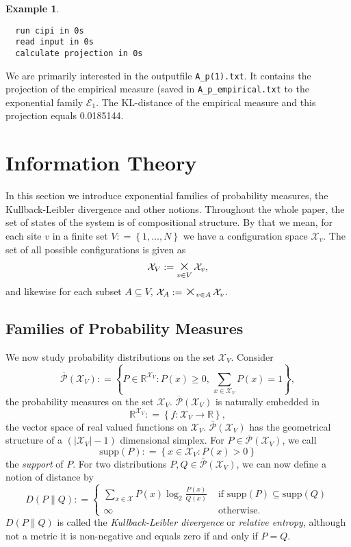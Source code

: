 \documentclass[12pt]{amsart}
\newcommand{\set}[1]{\left\lbrace #1 \right\rbrace} %
\newcommand{\defas}{\mathrel{\mathop{:}}=}   %
\renewcommand{\subset}{\subseteq}  %
\DeclareMathOperator*{\bigtimes}{\textnormal{\Large $\times$}} %
\theoremstyle{plain}%
\theoremstyle{definition}
\newtheorem{exmp}[thm]{Example}
\theoremstyle{remark}
\begin{document}
\begin{exmp}
\begin{verbatim}
  run cipi in 0s
  read input in 0s
  calculate projection in 0s
  \end{verbatim} We are
  primarily interested in the outputfile \texttt{A\_p(1).txt}. It contains the
  projection of the empirical measure (saved in \texttt{A\_p\_empirical.txt} to
  the exponential family $\mathcal{E}_1$. The KL-distance of the empirical
  measure and this projection equals 0.0185144.

\end{exmp}

\section{Information Theory}
\label{sec:theory}
In this section we introduce exponential families of probability
measures, the Kullback-Leibler divergence and other notions.
Throughout the whole paper, the set of states of the system is of compositional
structure. By that we mean, for each site $v$ in a finite set $V \defas
\set{1,\ldots, N}$ we have a configuration space $\mathcal{X}_v$. The set of all
possible configurations is given as 
\begin{equation*}
\mathcal{X}_V \defas \bigtimes_{v\in V}\mathcal{X}_v,
\end{equation*}and likewise for each subset $A\subset V$, $\mathcal{X}_A \defas
\bigtimes_{v\in A}\mathcal{X}_v$.

\subsection{Families of Probability Measures} 
We now study probability distributions on the set
$\mathcal{X}_V$. Consider 
\[
\overline{\mathcal{P}}(\mathcal{X}_V)
\defas \set{P \in \mathbb{R}^{\mathcal{X}_V} : P(x) \geq 0,\,
  \sum_{x\in\mathcal{X}_V} P(x) = 1},
\]  
the probability measures on
the set $\mathcal{X}_V$.
$\overline{\mathcal{P}}(\mathcal{X}_V)$ is naturally embedded in
\[
\mathbb{R}^{\mathcal{X}_V} \defas \set{f : \mathcal{X}_V \to \mathbb{R}},
\] the vector space of real valued functions on $\mathcal{X}_V$.
$\overline{\mathcal{P}}(\mathcal{X}_V)$ has the geometrical structure of a
$(|\mathcal{X}_V| -1)$ dimensional simplex. For $P\in
\overline{\mathcal{P}}(\mathcal{X}_V)$, we call \[ \mbox{supp}(P) \defas
\set{x \in \mathcal{X}_V : P(x) > 0} \] the \emph{support} of
$P$. For two distributions $P,Q \in \overline{\mathcal{P}}(\mathcal{X}_V)$,
we can now define a notion of distance by
\begin{equation*}
  D(P\parallel Q ) \defas \left\lbrace 
  \begin{array}{ll}
    \sum_{x\in\mathcal{X}} P(x) \log_2
    \frac{P(x)}{Q(x)} & \mbox{ if } \mbox{supp}(P) \subset
    \mbox{supp}(Q) \\ 
    \infty & \mbox{ otherwise}.
  \end{array} \right.
\end{equation*}
$D(P\parallel Q)$ is called the \emph{Kullback-Leibler divergence} or
\emph{relative entropy}, although not a metric it is non-negative and
equals zero if and only if $P=Q$. 
\end{document}
